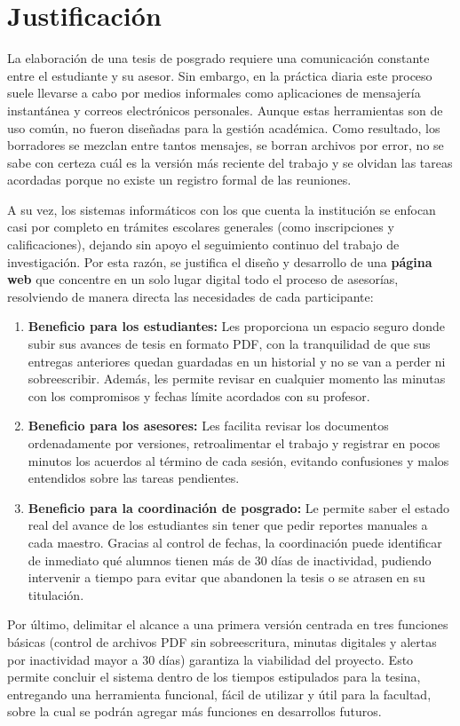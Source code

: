 \section{Justificación}
\label{sec:justificacion}

La elaboración de una tesis de posgrado requiere una comunicación constante entre el estudiante y su asesor. Sin embargo, en la práctica diaria este proceso suele llevarse a cabo por medios informales como aplicaciones de mensajería instantánea y correos electrónicos personales. Aunque estas herramientas son de uso común, no fueron diseñadas para la gestión académica. Como resultado, los borradores se mezclan entre tantos mensajes, se borran archivos por error, no se sabe con certeza cuál es la versión más reciente del trabajo y se olvidan las tareas acordadas porque no existe un registro formal de las reuniones.

A su vez, los sistemas informáticos con los que cuenta la institución se enfocan casi por completo en trámites escolares generales (como inscripciones y calificaciones), dejando sin apoyo el seguimiento continuo del trabajo de investigación. Por esta razón, se justifica el diseño y desarrollo de una \textbf{página web} que concentre en un solo lugar digital todo el proceso de asesorías, resolviendo de manera directa las necesidades de cada participante:

\begin{enumerate}
    \item \textbf{Beneficio para los estudiantes:} Les proporciona un espacio seguro donde subir sus avances de tesis en formato PDF, con la tranquilidad de que sus entregas anteriores quedan guardadas en un historial y no se van a perder ni sobreescribir. Además, les permite revisar en cualquier momento las minutas con los compromisos y fechas límite acordados con su profesor.
    
    \item \textbf{Beneficio para los asesores:} Les facilita revisar los documentos ordenadamente por versiones, retroalimentar el trabajo y registrar en pocos minutos los acuerdos al término de cada sesión, evitando confusiones y malos entendidos sobre las tareas pendientes.
    
    \item \textbf{Beneficio para la coordinación de posgrado:} Le permite saber el estado real del avance de los estudiantes sin tener que pedir reportes manuales a cada maestro. Gracias al control de fechas, la coordinación puede identificar de inmediato qué alumnos tienen más de 30 días de inactividad, pudiendo intervenir a tiempo para evitar que abandonen la tesis o se atrasen en su titulación.
\end{enumerate}

Por último, delimitar el alcance a una primera versión centrada en tres funciones básicas (control de archivos PDF sin sobreescritura, minutas digitales y alertas por inactividad mayor a 30 días) garantiza la viabilidad del proyecto. Esto permite concluir el sistema dentro de los tiempos estipulados para la tesina, entregando una herramienta funcional, fácil de utilizar y útil para la facultad, sobre la cual se podrán agregar más funciones en desarrollos futuros.